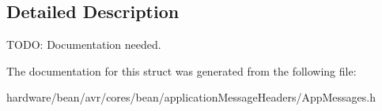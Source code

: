 \subsection{Detailed Description}
T\+O\+D\+O\+: Documentation needed. 

The documentation for this struct was generated from the following file\+:\begin{DoxyCompactItemize}
\item 
hardware/bean/avr/cores/bean/application\+Message\+Headers/App\+Messages.\+h\end{DoxyCompactItemize}
